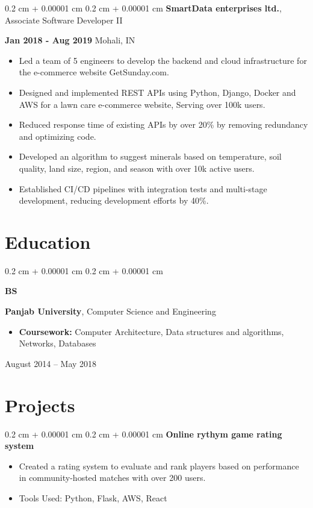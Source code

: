 \documentclass[10pt, letterpaper]{article}
\newenvironment{highlights}{
    \begin{itemize}[
        topsep=0.10 cm,
        parsep=0.10 cm,
        partopsep=0pt,
        itemsep=0pt,
        leftmargin=0.4 cm + 10pt
    ]
}{
    \end{itemize}
} %
\newenvironment{onecolentry}{
    \begin{adjustwidth}{
        0.2 cm + 0.00001 cm
    }{
        0.2 cm + 0.00001 cm
    }
}{
    \end{adjustwidth}
} %
\newenvironment{threecolentry}[3][]{
    \onecolentry
    \def\thirdColumn{#3}
    \setcolumnwidth{1 cm, \fill, 4.5 cm}
    \begin{paracol}{3}
    {\raggedright #2} \switchcolumn
}{
    \switchcolumn \raggedleft \thirdColumn
    \end{paracol}
    \endonecolentry
} %
\begin{document}
        \begin{onecolentry}{
        }
            \textbf{SmartData enterprises ltd.}, Associate Software Developer II

            
            \textbf {Jan 2018 - Aug 2019} Mohali, IN
            \begin{highlights}
                \item Led a team of 5 engineers to develop the backend and cloud infrastructure for the e-commerce website GetSunday.com.
                \item Designed and implemented REST APIs using Python, Django, Docker and AWS for a lawn care e-commerce website, Serving over 100k users.
                \item Reduced response time of existing APIs by over 20\% by removing redundancy and optimizing code.
                \item Developed an algorithm to suggest minerals based on temperature, soil quality, land size, region, and season with over 10k active users.
                \item Established CI/CD pipelines with integration tests and multi-stage development, reducing development efforts by 40\%.
            \end{highlights}
        \end{onecolentry}

    \section{Education}
        
        \begin{threecolentry}{\textbf{BS}}{
            August 2014 – May 2018
        }
            \textbf{Panjab University}, Computer Science and Engineering
            \begin{highlights}
                \item \textbf{Coursework:} Computer Architecture, Data structures and algorithms, Networks, Databases
            \end{highlights}
        \end{threecolentry}

    \section{Projects}
        
        \begin{onecolentry}{
            \textbf{Online rythym game rating system}
        }
            \begin{highlights}
                \item Created a rating system to evaluate and rank players based on performance in community-hosted matches with over 200 users.
                \item Tools Used: Python, Flask, AWS, React 
            \end{highlights}
        \end{onecolentry}
\end{document}
